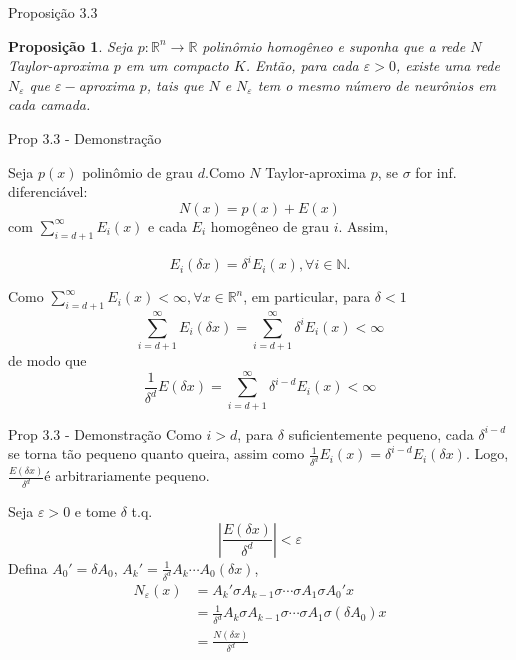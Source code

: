 \documentclass{beamer}
\newtheorem{prop}{Proposição}[section]
\theoremstyle{definition}
\begin{document}
\begin{frame}{Proposição 3.3}
    \begin{prop}
    Seja $p:\mathbb R^n \to \mathbb R$ polinômio homogêneo e suponha que a rede $N$ Taylor-aproxima $p$ em um compacto $K$. Então, para cada $\varepsilon>0$, existe uma rede $N_{\varepsilon}$ que $\varepsilon-$aproxima $p$, tais que $N$ e $N_\varepsilon$ tem o mesmo número de neurônios em cada camada.
    \end{prop}
\end{frame}

\begin{frame}{Prop 3.3 - Demonstração}
    \small

    Seja $p(x)$ polinômio de grau $d$.\pause Como $N$ Taylor-aproxima $p$, se $\sigma$ for inf. diferenciável:
    \begin{equation}
        N(x) = p(x) + E(x)
    \end{equation}
    com $\sum_{i=d+1}^\infty E_i(x)$ e cada $E_i$ homogêneo de grau $i$. \pause Assim,
    
    \begin{equation*}
        E_i(\delta x) = \delta^i E_i(x), \forall i \in \mathbb N.
    \end{equation*}

    \pause 

    Como $\sum_{i=d+1}^\infty E_i(x)<\infty, \forall x \in \mathbb R^n$, em particular, para $\delta<1$
    \begin{equation*}
        \sum_{i=d+1}^\infty E_i(\delta x) = \sum_{i=d+1}^\infty \delta^i E_i(x) <\infty
    \end{equation*}
    \pause de modo que
    \begin{equation*}
        \frac{1}{\delta^d} E(\delta x) = \sum_{i=d+1}^\infty \delta^{i-d} E_i(x) <\infty
    \end{equation*}
\end{frame}

\begin{frame}{Prop 3.3 - Demonstração}
    Como $i>d$, para $\delta$ suficientemente pequeno, cada $\delta^{i-d}$ se torna tão pequeno quanto queira, assim como $\frac{1}{\delta^d}E_i(x) = \delta^{i-d} E_i(\delta x)$. Logo, $\frac{E(\delta x)}{\delta^d}$é arbitrariamente pequeno.

    \pause

    Seja $\varepsilon>0$ e tome $\delta$ t.q.
    \begin{equation}
        |\frac{E(\delta x)}{\delta^d} |<\varepsilon
    \end{equation}
    Defina $A_0' = \delta A_0$, $A_k' = \frac{1}{\delta^d} A_k \cdots A_0 (\delta x)$, \pause 
    \begin{align}
        N_\varepsilon(x) &= A_k' \sigma A_{k-1} \sigma \cdots \sigma A_1 \sigma A_0' x \\
        & = \frac{1}{\delta^d} A_k \sigma A_{k-1} \sigma \cdots \sigma A_1 \sigma (\delta A_0) x \\
        & = \frac{N(\delta x)}{\delta^d}
    \end{align}
\end{frame}
\end{document}
